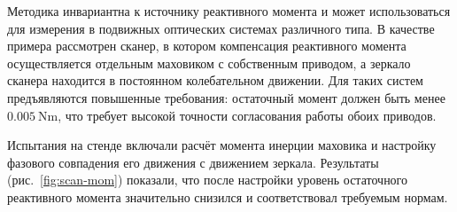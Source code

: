 Методика инвариантна к источнику реактивного момента и может использоваться для измерения в подвижных оптических системах различного типа. В качестве примера рассмотрен сканер, в котором компенсация реактивного момента осуществляется отдельным маховиком с собственным приводом, а зеркало сканера находится в постоянном колебательном движении. Для таких систем предъявляются повышенные требования: остаточный момент должен быть менее $\SI{0,005}{\newton\meter}$, что требует высокой точности согласования работы обоих приводов.

Испытания на стенде включали расчёт момента инерции маховика и настройку фазового совпадения его движения с движением зеркала. Результаты (рис.~\ref{fig:scan-mom}) показали, что после настройки уровень остаточного реактивного момента значительно снизился и соответствовал требуемым нормам.

